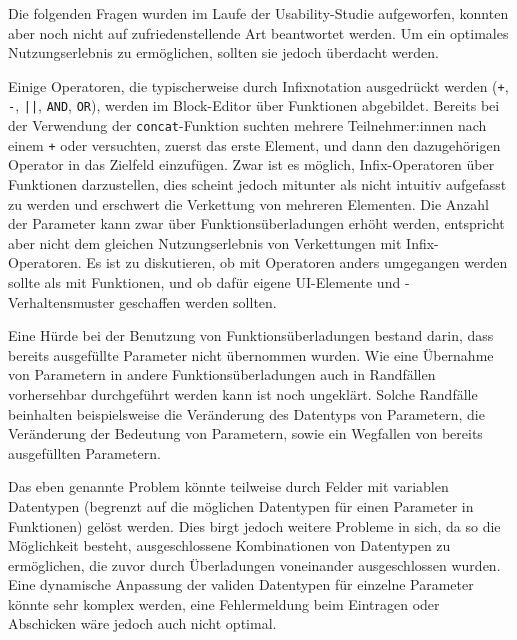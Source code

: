 Die folgenden Fragen wurden im Laufe der Usability-Studie aufgeworfen, konnten aber noch nicht auf zufriedenstellende Art beantwortet werden. Um ein optimales Nutzungserlebnis zu ermöglichen, sollten sie jedoch überdacht werden.

Einige Operatoren, die typischerweise durch Infixnotation ausgedrückt werden (\texttt{+}, \texttt{-}, \texttt{||}, \texttt{AND}, \texttt{OR}), werden im Block-Editor über Funktionen abgebildet. Bereits bei der Verwendung der \texttt{concat}-Funktion suchten mehrere Teilnehmer:innen nach einem \texttt{+} oder versuchten, zuerst das erste Element, und dann den dazugehörigen Operator in das Zielfeld einzufügen. Zwar ist es möglich, Infix-Operatoren über Funktionen darzustellen, dies scheint jedoch mitunter als nicht intuitiv aufgefasst zu werden und erschwert die Verkettung von mehreren Elementen. Die Anzahl der Parameter kann zwar über Funktionsüberladungen erhöht werden, entspricht aber nicht dem gleichen Nutzungserlebnis von Verkettungen mit Infix-Operatoren. Es ist zu diskutieren, ob mit Operatoren anders umgegangen werden sollte als mit Funktionen, und ob dafür eigene UI-Elemente und -Verhaltensmuster geschaffen werden sollten.

Eine Hürde bei der Benutzung von Funktionsüberladungen bestand darin, dass bereits ausgefüllte Parameter nicht übernommen wurden. Wie eine Übernahme von Parametern in andere Funktionsüberladungen auch in Randfällen vorhersehbar durchgeführt werden kann ist noch ungeklärt. Solche Randfälle beinhalten beispielsweise die Veränderung des Datentyps von Parametern, die Veränderung der Bedeutung von Parametern, sowie ein Wegfallen von bereits ausgefüllten Parametern.

Das eben genannte Problem könnte teilweise durch Felder mit variablen Datentypen (begrenzt auf die möglichen Datentypen für einen Parameter in Funktionen) gelöst werden. Dies birgt jedoch weitere Probleme in sich, da so die Möglichkeit besteht, ausgeschlossene Kombinationen von Datentypen zu ermöglichen, die zuvor durch Überladungen voneinander ausgeschlossen wurden. Eine dynamische Anpassung der validen Datentypen für einzelne Parameter könnte sehr komplex werden, eine Fehlermeldung beim Eintragen oder Abschicken wäre jedoch auch nicht optimal.

